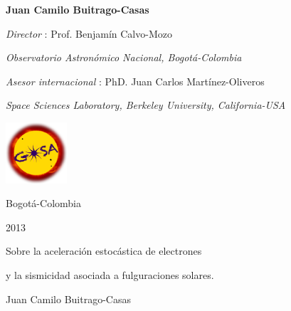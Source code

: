 \centerline{\large{\bf Juan Camilo Buitrago-Casas}} 
\vspace{1.2 cm}
\centerline{\large {\it Director} :  Prof. Benjam\'in Calvo-Mozo}
\centerline{{\it Observatorio Astron\'omico Nacional, Bogot\'a-Colombia}}
\vspace{0.3 cm}
\centerline{\large {\it Asesor internacional} :  PhD. Juan Carlos Mart\'inez-Oliveros}
\centerline{{\it Space Sciences Laboratory, Berkeley University, California-USA}}
\vspace{0.5 cm}
\begin{center}
\includegraphics[width=0.17\textwidth]{imagenes/gosa.png}
\end{center}
\centerline{Bogot\'a-Colombia}
\centerline{2013}
\newpage
\centerline {\Large Sobre la aceleraci\'on estoc\'astica de electrones}
\centerline {\Large y la sismicidad asociada a fulguraciones solares.}
\vspace{1.0 cm}
\centerline{Juan Camilo Buitrago-Casas} 
\vspace{1.5 cm}
